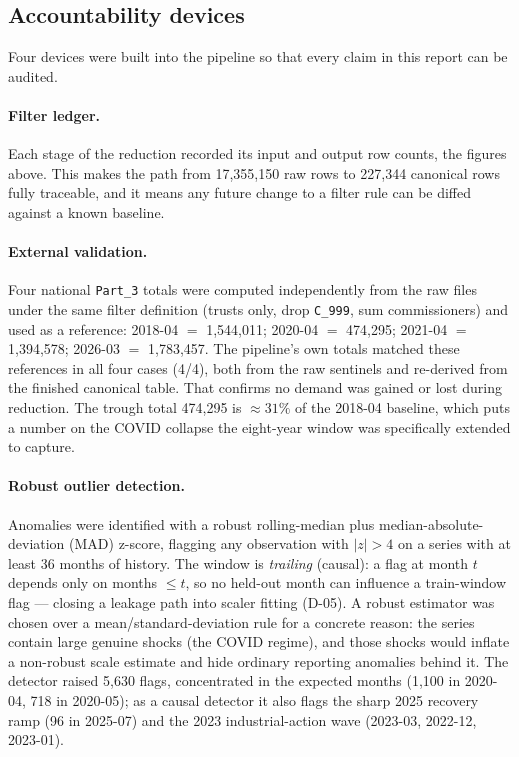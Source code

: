 \documentclass[11pt,a4paper]{article}
\begin{document}
\subsection{Accountability devices}
Four devices were built into the pipeline so that every claim in this report can be audited.

\paragraph{Filter ledger.} Each stage of the reduction recorded its input and output row counts, the figures above. This makes the path from 17,355,150 raw rows to 227,344 canonical rows fully traceable, and it means any future change to a filter rule can be diffed against a known baseline.

\paragraph{External validation.} Four national \texttt{Part\_3} totals were computed independently from the raw files under the same filter definition (trusts only, drop \texttt{C\_999}, sum commissioners) and used as a reference: 2018-04 $=$ 1,544,011; 2020-04 $=$ 474,295; 2021-04 $=$ 1,394,578; 2026-03 $=$ 1,783,457. The pipeline's own totals matched these references in all four cases (4/4), both from the raw sentinels and re-derived from the finished canonical table. That confirms no demand was gained or lost during reduction. The trough total 474,295 is $\approx 31\%$ of the 2018-04 baseline, which puts a number on the COVID collapse the eight-year window was specifically extended to capture.

\paragraph{Robust outlier detection.} Anomalies were identified with a robust rolling-median plus median-absolute-deviation (MAD) z-score, flagging any observation with $|z| > 4$ on a series with at least 36 months of history. The window is \emph{trailing} (causal): a flag at month $t$ depends only on months $\le t$, so no held-out month can influence a train-window flag --- closing a leakage path into scaler fitting (D-05). A robust estimator was chosen over a mean/standard-deviation rule for a concrete reason: the series contain large genuine shocks (the COVID regime), and those shocks would inflate a non-robust scale estimate and hide ordinary reporting anomalies behind it. The detector raised 5,630 flags, concentrated in the expected months (1,100 in 2020-04, 718 in 2020-05); as a causal detector it also flags the sharp 2025 recovery ramp (96 in 2025-07) and the 2023 industrial-action wave (2023-03, 2022-12, 2023-01).
\end{document}
